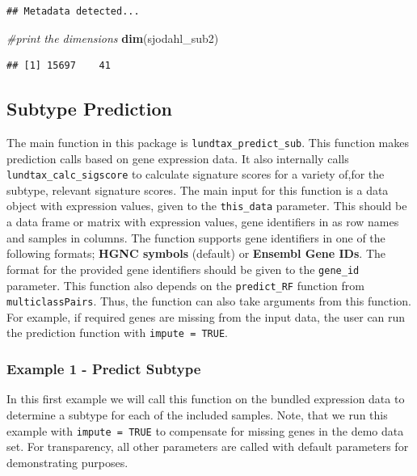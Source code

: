 \documentclass[
]{article}
\newenvironment{Shaded}{\begin{snugshade}}{\end{snugshade}}
\newcommand{\CommentTok}[1]{\textcolor[rgb]{0.56,0.35,0.01}{\textit{#1}}}
\newcommand{\FunctionTok}[1]{\textcolor[rgb]{0.13,0.29,0.53}{\textbf{#1}}}
\newcommand{\NormalTok}[1]{#1}
\begin{document}
\begin{verbatim}
## Metadata detected...
\end{verbatim}

\begin{Shaded}
\begin{Highlighting}[]
\CommentTok{\#print the dimensions}
\FunctionTok{dim}\NormalTok{(sjodahl\_sub2)}
\end{Highlighting}
\end{Shaded}

\begin{verbatim}
## [1] 15697    41
\end{verbatim}

\subsection{Subtype Prediction}\label{subtype-prediction}

The main function in this package is \texttt{lundtax\_predict\_sub}.
This function makes prediction calls based on gene expression data. It
also internally calls \texttt{lundtax\_calc\_sigscore} to calculate
signature scores for a variety of,for the subtype, relevant signature
scores. The main input for this function is a data object with
expression values, given to the \texttt{this\_data} parameter. This
should be a data frame or matrix with expression values, gene
identifiers in as row names and samples in columns. The function
supports gene identifiers in one of the following formats; \textbf{HGNC
symbols} (default) or \textbf{Ensembl Gene IDs}. The format for the
provided gene identifiers should be given to the \texttt{gene\_id}
parameter. This function also depends on the \texttt{predict\_RF}
function from \texttt{multiclassPairs}. Thus, the function can also take
arguments from this function. For example, if required genes are missing
from the input data, the user can run the prediction function with
\texttt{impute\ =\ TRUE}.

\subsubsection{Example 1 - Predict
Subtype}\label{example-1---predict-subtype}

In this first example we will call this function on the bundled
expression data to determine a subtype for each of the included samples.
Note, that we run this example with \texttt{impute\ =\ TRUE} to
compensate for missing genes in the demo data set. For transparency, all
other parameters are called with default parameters for demonstrating
purposes.
\end{document}
